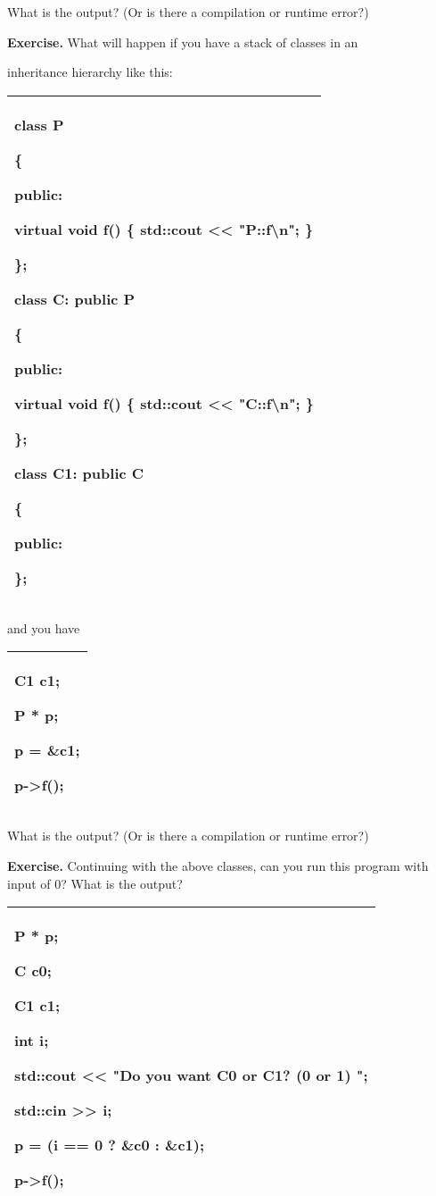 \documentclass[
]{article}
\begin{document}
What is the output? (Or is there a compilation or runtime error?)

\textbf{Exercise. }What will happen if you have a stack of classes in an

inheritance hierarchy like this:

\begin{longtable}[]{@{}l@{}}
\toprule
\endhead
\begin{minipage}[t]{0.97\columnwidth}\raggedright
class P

\{

public:

virtual void f() \{ std::cout \textless\textless{}
"P::f\textbackslash n"; \}

\};

class C: public P

\{

public:

virtual void f() \{ std::cout \textless\textless{}
"C::f\textbackslash n"; \}

\};

class C1: public C

\{

public:

\};\strut
\end{minipage}\tabularnewline
\bottomrule
\end{longtable}

and you have

\begin{longtable}[]{@{}l@{}}
\toprule
\endhead
\begin{minipage}[t]{0.97\columnwidth}\raggedright
C1 c1;

P * p;

p = \&c1;

p-\textgreater f();\strut
\end{minipage}\tabularnewline
\bottomrule
\end{longtable}

What is the output? (Or is there a compilation or runtime error?)

\textbf{Exercise. }Continuing with the above classes, can you run this
program with input of 0? What is the output?

\begin{longtable}[]{@{}l@{}}
\toprule
\endhead
\begin{minipage}[t]{0.97\columnwidth}\raggedright
P * p;

C c0;

C1 c1;

int i;

std::cout \textless\textless{} "Do you want C0 or C1? (0 or 1) ";

std::cin \textgreater\textgreater{} i;

p = (i == 0 ? \&c0 : \&c1);

p-\textgreater f();\strut
\end{minipage}\tabularnewline
\bottomrule
\end{longtable}
\end{document}
